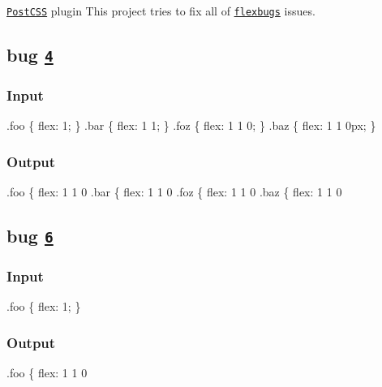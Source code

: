 \href{https://github.com/postcss/postcss}{\tt Post\+C\+SS} plugin This project tries to fix all of \href{https://github.com/philipwalton/flexbugs}{\tt flexbug\textquotesingle{}s} issues.

\subsection*{bug \href{https://github.com/philipwalton/flexbugs/blob/master/README.md#4-flex-shorthand-declarations-with-unitless-flex-basis-values-are-ignored}{\tt 4}}

\subsubsection*{Input}


\begin{DoxyCode}
.foo \{ flex: 1; \}
.bar \{ flex: 1 1; \}
.foz \{ flex: 1 1 0; \}
.baz \{ flex: 1 1 0px; \}
\end{DoxyCode}


\subsubsection*{Output}


\begin{DoxyCode}
.foo \{ flex: 1 1 0%
.bar \{ flex: 1 1 0%
.foz \{ flex: 1 1 0%
.baz \{ flex: 1 1 0%
\end{DoxyCode}


\subsection*{bug \href{https://github.com/philipwalton/flexbugs/blob/master/README.md#6-the-default-flex-value-has-changed}{\tt 6}}

\subsubsection*{Input}


\begin{DoxyCode}
.foo \{ flex: 1; \}
\end{DoxyCode}


\subsubsection*{Output}


\begin{DoxyCode}
.foo \{ flex: 1 1 0%
\end{DoxyCode}


